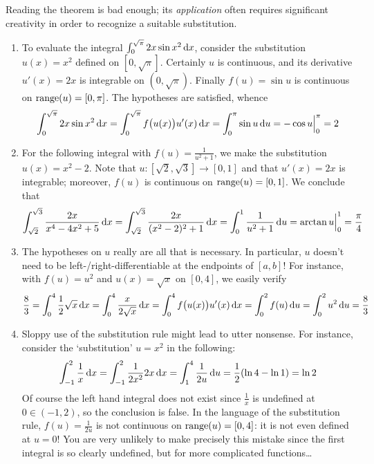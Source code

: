 \begin{examples}{}{}
Reading the theorem is bad enough; its \emph{application} often requires significant creativity in order to recognize a suitable substitution.\footnotemark
\begin{enumerate}
  \item To evaluate the integral $\int_0^{\sqrt\pi}2x\sin x^2\,{\mathrm{d} x}$, consider the substitution $u(x)=x^2$ defined on $[0,\sqrt\pi]$. Certainly $u$ is continuous, and its derivative $u'(x)=2x$ is integrable on $(0,\sqrt\pi)$. Finally $f(u)=\sin u$ is continuous on $\operatorname{range}(u)=[0,\pi]$. The hypotheses are satisfied, whence
  \[\int_0^{\sqrt\pi}2x\sin x^2\,{\mathrm{d} x} = \int_0^{\sqrt\pi} f\bigl(u(x)\bigr)u'(x)\,{\mathrm{d} x} =\int_0^\pi\sin u\,{\mathrm{d} u} =-\cos u\Big|_0^\pi=2\]
	\item For the following integral with $f(u)=\frac 1{u^2+1}$, we make the substitution $u(x)=x^2-2$. Note that $u:[\sqrt 2,\sqrt 3]\to[0,1]$ and that $u'(x)=2x$ is integrable; moreover, $f(u)$ is continuous on $\operatorname{range}(u)=[0,1]$. We conclude that
\[\int_{\sqrt 2}^{\sqrt 3}\frac{2x}{x^4-4x^2+5}\,{\mathrm{d} x}=\int_{\sqrt 2}^{\sqrt 3}\frac{2x}{(x^2-2)^2+1}\,{\mathrm{d} x}= \int_0^1\frac{1}{u^2+1}\,{\mathrm{d} u} =\arctan u\Big|_0^1=\frac\pi 4\]
	\item The hypotheses on $u$ really are all that is necessary. In particular, $u$ doesn't need to be left-/right-differentiable at the endpoints of $[a,b]$! For instance, with $f(u)=u^2$ and $u(x)=\sqrt x$ on $[0,4]$, we easily verify
	\[\frac 83=\int_0^4\frac 12\sqrt x\,{\mathrm{d} x} =\int_0^4\frac x{2\sqrt x}\,{\mathrm{d} x} =\int_0^4f\bigl(u(x)\bigr)u'(x)\,{\mathrm{d} x}=\int_0^2f(u)\,{\mathrm{d} u} =\int_0^2u^2\,{\mathrm{d} u} =\frac 83\]
	\item Sloppy use of the substitution rule might lead to utter nonsense. For instance, consider the `substitution' $u=x^2$ in the following:
	\[\int_{-1}^2\frac 1x\,{\mathrm{d} x}= \int_{-1}^2\frac 1{2x^2}2x\,{\mathrm{d} x} =\int_1^4\frac 1{2u}\,{\mathrm{d} u}=\frac 12(\ln 4-\ln 1)=\ln 2\]
	Of course the left hand integral does not exist since $\frac 1x$ is undefined at $0\in(-1,2)$, so the conclusion is false. In the language of the substitution rule, $f(u)=\frac 1{2u}$ is not continuous on $\operatorname{range}(u)=[0,4]$: it is not even defined at $u=0$! You are very unlikely to make precisely this mistake since the first integral is so clearly undefined, but for more complicated functions\ldots
\end{enumerate}
\end{examples}



